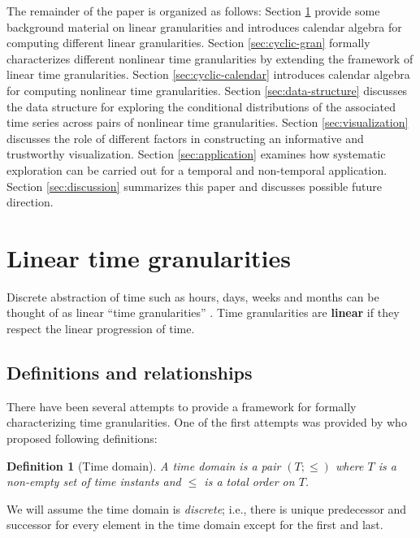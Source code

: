\documentclass[12pt]{article}
\begin{document}
The remainder of the paper is organized as follows: Section \ref{sec:linear-time} provide some background material on linear granularities and introduces calendar algebra for computing different linear granularities. Section \ref{sec:cyclic-gran} formally characterizes different nonlinear time granularities by extending the framework of linear time granularities. Section \ref{sec:cyclic-calendar} introduces calendar algebra for computing nonlinear time granularities. Section \ref{sec:data-structure} discusses the data structure for exploring the conditional distributions of the associated time series across pairs of nonlinear time granularities. Section \ref{sec:visualization} discusses the role of different factors in constructing an informative and trustworthy visualization. Section \ref{sec:application} examines how systematic exploration can be carried out for a temporal and non-temporal application. Section \ref{sec:discussion} summarizes this paper and discusses possible future direction.

\hypertarget{sec:linear-time}{%
\section{Linear time granularities}\label{sec:linear-time}}

Discrete abstraction of time such as hours, days, weeks and months can be thought of as linear ``time granularities'' \citep{aigner2011visualization}. Time granularities are \textbf{linear} if they respect the linear progression of time.

\hypertarget{definitions-and-relationships}{%
\subsection{Definitions and relationships}\label{definitions-and-relationships}}

There have been several attempts to provide a framework for formally characterizing time granularities. One of the first attempts was provided by \citet{Bettini1998-ed} who proposed following definitions:

\newtheorem{definition}{Definition}

\begin{definition}[Time domain]\label{def:definition}
A time domain is a pair $(T; \le)$ where $T$ is a non-empty set of time instants and $\le$ is a total order on $T$.
\end{definition}

We will assume the time domain is \emph{discrete}; i.e., there is unique predecessor and successor for every element in the time domain except for the first and last.
\end{document}
